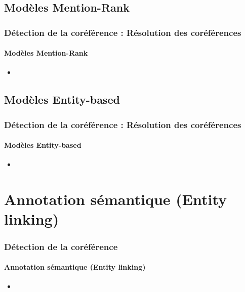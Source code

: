\documentclass[xcolor=table]{beamer}
\begin{document}
\subsection{Modèles Mention-Rank}

\begin{frame}
	\frametitle{Détection de la coréférence : Résolution des coréférences}
	\framesubtitle{Modèles Mention-Rank}
	
	\begin{itemize}
		\item 
	\end{itemize}
	
\end{frame}

\subsection{Modèles Entity-based}

\begin{frame}
	\frametitle{Détection de la coréférence : Résolution des coréférences}
	\framesubtitle{Modèles Entity-based}
	
	\begin{itemize}
		\item 
	\end{itemize}
	
\end{frame}

\section{Annotation sémantique (Entity linking)}

\begin{frame}
	\frametitle{Détection de la coréférence}
	\framesubtitle{Annotation sémantique (Entity linking)}
	
	\begin{itemize}
		\item 
	\end{itemize}
	
\end{frame}


\end{document}
